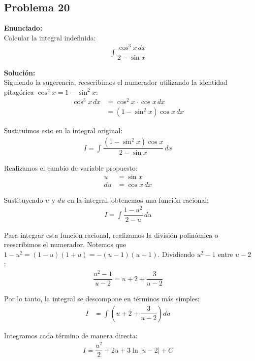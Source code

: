 \subsection*{Problema 20}

\textbf{Enunciado:} \\
Calcular la integral indefinida:
\begin{align*}
\int \dfrac{\cos^3 x \, dx}{2 - \sin x}
\end{align*}

\textbf{Solución:} \\
Siguiendo la sugerencia, reescribimos el numerador utilizando la identidad pitagórica $\cos^2 x = 1 - \sin^2 x$:
\begin{align*}
\cos^3 x \, dx &= \cos^2 x \cdot \cos x \, dx \\
&= (1 - \sin^2 x)\cos x \, dx
\end{align*}

Sustituimos esto en la integral original:
\begin{align*}
I = \int \dfrac{(1 - \sin^2 x)\cos x}{2 - \sin x} \, dx
\end{align*}

Realizamos el cambio de variable propuesto:
\begin{align*}
u &= \sin x \\
du &= \cos x \, dx
\end{align*}

Sustituyendo $u$ y $du$ en la integral, obtenemos una función racional:
\begin{align*}
I = \int \dfrac{1 - u^2}{2 - u} \, du
\end{align*}

Para integrar esta función racional, realizamos la división polinómica o reescribimos el numerador. Notemos que $1 - u^2 = (1 - u)(1 + u) = -(u - 1)(u + 1)$. Dividiendo $u^2 - 1$ entre $u - 2$:
\begin{align*}
\dfrac{u^2 - 1}{u - 2} = u + 2 + \dfrac{3}{u - 2}
\end{align*}

Por lo tanto, la integral se descompone en términos más simples:
\begin{align*}
I &= \int \left( u + 2 + \dfrac{3}{u - 2} \right) du
\end{align*}

Integramos cada término de manera directa:
\begin{align*}
I = \dfrac{u^2}{2} + 2u + 3\ln|u - 2| + C
\end{align*}

